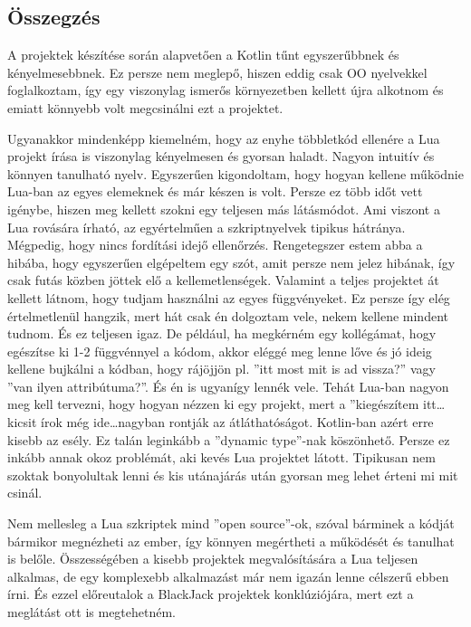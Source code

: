 \subsection{Összegzés}
\label{subsec:p_summL}

A projektek készítése során alapvetően a Kotlin tűnt egyszerűbbnek és kényelmesebbnek. Ez persze nem meglepő, hiszen eddig csak OO nyelvekkel foglalkoztam, így egy viszonylag ismerős környezetben kellett újra alkotnom és emiatt könnyebb volt megcsinálni ezt a projektet. 

Ugyanakkor mindenképp kiemelném, hogy az enyhe többletkód ellenére a Lua projekt írása is viszonylag kényelmesen és gyorsan haladt. Nagyon intuitív és könnyen tanulható nyelv. Egyszerűen kigondoltam, hogy hogyan kellene működnie Lua-ban az egyes elemeknek és már készen is volt. Persze ez több időt vett igénybe, hiszen meg kellett szokni egy teljesen más látásmódot. Ami viszont a Lua rovására írható, az egyértelműen a szkriptnyelvek tipikus hátránya. Mégpedig, hogy nincs fordítási idejő ellenőrzés. Rengetegszer estem abba a hibába, hogy egyszerűen elgépeltem egy szót, amit persze nem jelez hibának, így csak futás közben jöttek elő a kellemetlenségek. Valamint a teljes projektet át kellett látnom, hogy tudjam használni az egyes függvényeket. Ez persze így elég értelmetlenül hangzik, mert hát csak én dolgoztam vele, nekem kellene mindent tudnom. És ez teljesen igaz. De például, ha megkérném egy kollégámat, hogy egészítse ki 1-2 függvénnyel a kódom, akkor eléggé meg lenne lőve és jó ideig kellene bujkálni a kódban, hogy rájöjjön pl. ''itt most mit is ad vissza?'' vagy ''van ilyen attribútuma?''. És én is ugyanígy lennék vele. Tehát Lua-ban nagyon meg kell tervezni, hogy hogyan nézzen ki egy projekt, mert a ''kiegészítem itt\dots kicsit írok még ide\dots nagyban rontják az átláthatóságot. Kotlin-ban azért erre kisebb az esély. Ez talán leginkább a ''dynamic type''-nak köszönhető. Persze ez inkább annak okoz problémát, aki kevés Lua projektet látott. Tipikusan nem szoktak bonyolultak lenni és kis utánajárás után gyorsan meg lehet érteni mi mit csinál.

Nem mellesleg a Lua szkriptek mind ''open source''-ok, szóval bárminek a kódját bármikor megnézheti az ember, így könnyen megértheti a működését és tanulhat is belőle. Összességében a kisebb projektek megvalósítására a Lua teljesen alkalmas, de egy komplexebb alkalmazást már nem igazán lenne célszerű ebben írni. És ezzel előreutalok a BlackJack projektek konklúziójára, mert ezt a meglátást ott is megtehetném.



